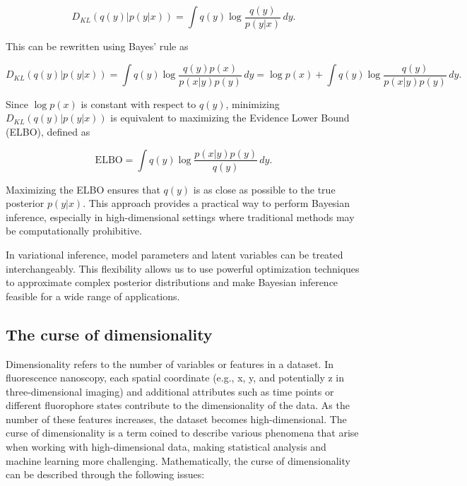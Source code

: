\begin{equation*}
D_{KL}(q(y) \lvert p(y \lvert x)) = \int q(y) \log \frac{q(y)}{p(y \lvert x)} \, dy.
\end{equation*}

This can be rewritten using Bayes' rule as

\begin{equation*}
D_{KL}(q(y) \lvert p(y \lvert x)) = \int q(y) \log \frac{q(y) p(x)}{p(x \lvert y) p(y)} \, dy = \log p(x) + \int q(y) \log \frac{q(y)}{p(x \lvert y) p(y)} \, dy.
\end{equation*}

Since $\log p(x)$ is constant with respect to $q(y)$, minimizing $D_{KL}(q(y) \lvert p(y \lvert x))$ is equivalent to maximizing the Evidence Lower Bound (ELBO), defined as

\begin{equation*}
\mathrm{ELBO} = \int q(y) \log \frac{p(x \lvert y) p(y)}{q(y)} \, dy.
\end{equation*}

Maximizing the ELBO ensures that $q(y)$ is as close as possible to the true posterior $p(y \lvert x)$. This approach provides a practical way to perform Bayesian inference, especially in high-dimensional settings where traditional methods may be computationally prohibitive.

In variational inference, model parameters and latent variables can be treated interchangeably. This flexibility allows us to use powerful optimization techniques to approximate complex posterior distributions and make Bayesian inference feasible for a wide range of applications.

\subsection{The curse of dimensionality}

Dimensionality refers to the number of variables or features in a dataset. In fluorescence nanoscopy, each spatial coordinate (e.g., x, y, and potentially z in three-dimensional imaging) and additional attributes such as time points or different fluorophore states contribute to the dimensionality of the data. As the number of these features increases, the dataset becomes high-dimensional. The curse of dimensionality is a term coined to describe various phenomena that arise when working with high-dimensional data, making statistical analysis and machine learning more challenging. Mathematically, the curse of dimensionality can be described through the following issues:

